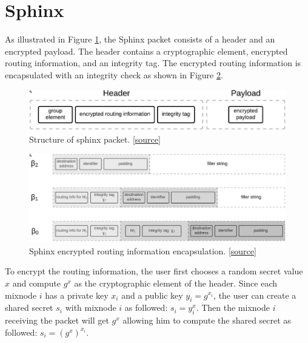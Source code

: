 \section{Sphinx}

As illustrated in Figure \ref{fig:sphinx_structure}, the Sphinx packet consists of a header and an encrypted payload. 
The header contains a cryptographic element, encrypted routing information, and an integrity tag.
The encrypted routing information is encapsulated with an integrity check as shown in Figure \ref{fig:sphinx_header}.

\begin{figure}[h]
    \centering
    \includegraphics[width=0.9\linewidth]{Images/sphinx_structure.png}
    \caption{Structure of sphinx packet. \href{https://blog.nymtech.net/sphinx-tl-dr-the-data-packet-that-can-anonymize-bitcoin-and-the-internet-18d152c6e4dc}{[source]}}
    \label{fig:sphinx_structure}
\end{figure}

\begin{figure}[h]
    \centering
    \includegraphics[width=\linewidth]{Images/sphinx_header.png}
    \caption{Sphinx encrypted routing information encapsulation. \href{https://blog.nymtech.net/sphinx-tl-dr-the-data-packet-that-can-anonymize-bitcoin-and-the-internet-18d152c6e4dc}{[source]}}
    \label{fig:sphinx_header}
\end{figure}

To encrypt the routing information, the user first chooses a random secret value $x$ and compute $g^x$ as the cryptographic element of the header.
Since each mixnode $i$ has a private key $x_i$ and a public key $y_i = g^{x_i}$, the user can create a shared secret $s_i$ with mixnode $i$ as followed: $s_i = y_i^x$. 
Then the mixnode $i$ receiving the packet will get $g^x$ allowing him to compute the shared secret as followed: $s_i = (g^x)^{x_i}$.

